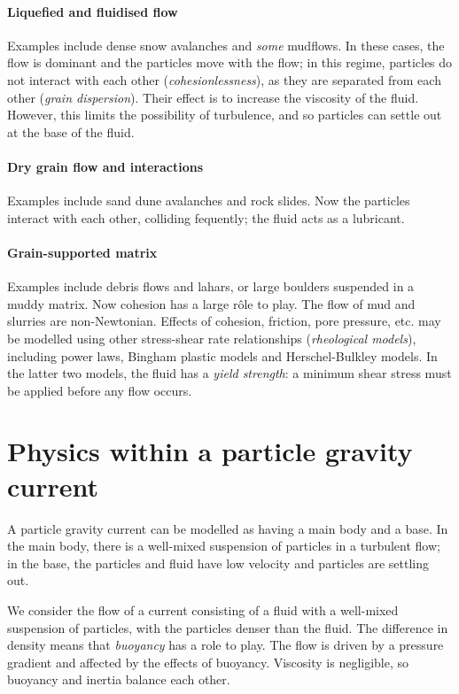 \paragraph{Liquefied and fluidised flow} Examples include dense snow avalanches
and \textit{some} mudflows. In these cases, the flow is dominant and the
particles move with the flow; in this regime, particles do not interact with
each other (\textit{cohesionlessness}), as they are separated from each other
(\textit{grain dispersion}). Their effect is to increase the viscosity of the
fluid. However, this limits the possibility of turbulence, and so particles can 
settle out at the base of the fluid.

\paragraph{Dry grain flow and interactions} Examples include sand dune
avalanches and rock slides. Now the particles interact with each other,
colliding fequently; the fluid acts as a lubricant. 

\paragraph{Grain-supported matrix} Examples include debris flows and lahars, or
large boulders suspended in a muddy matrix. Now cohesion has a large r\^ole to
play. The flow of mud and slurries are non-Newtonian. Effects of cohesion,
friction, pore pressure, etc. may be modelled using other stress-shear rate
relationships (\textit{rheological models}), including power laws, Bingham
plastic models and Herschel-Bulkley models. In the latter two models, the fluid
has a \textit{yield strength}: a minimum shear stress must be applied before any
flow occurs. 

\section{Physics within a particle gravity current}

A particle gravity current can be modelled as having a main body and a base. In
the main body, there is a well-mixed suspension of particles in a turbulent
flow; in the base, the particles and fluid have low velocity and particles are
settling out. 

We consider the flow of a current consisting of a fluid with a well-mixed
suspension of particles, with the particles denser than the fluid. The
difference in density means that \textit{buoyancy} has a role to play. The flow
is driven by a pressure gradient and affected by the effects of buoyancy.
Viscosity is negligible, so buoyancy and inertia balance each other. 

